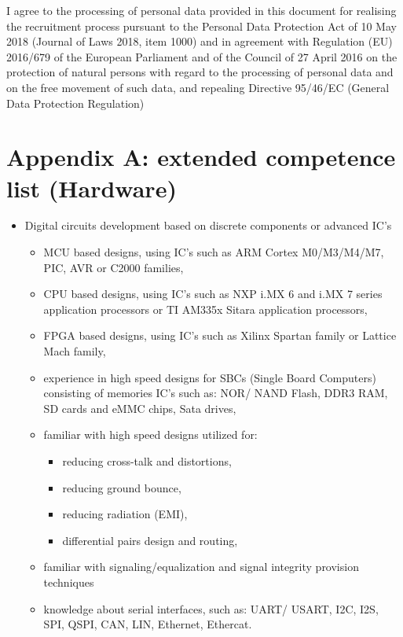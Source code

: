\documentclass{tccv}
\begin{document}
{\tiny I agree to the processing of personal data provided in this document for realising the recruitment process pursuant to the Personal Data Protection Act of 10 May 2018 (Journal of Laws 2018, item 1000) and in agreement with Regulation (EU) 2016/679 of the European Parliament and of the Council of 27 April 2016 on the protection of natural persons with regard to the processing of personal data and on the free movement of such data, and repealing Directive 95/46/EC (General Data Protection Regulation)}

\clearpage

\onecolumn

\section{Appendix A: extended competence list (Hardware)}

\begin{itemize}
	\item Digital circuits development based on discrete components or advanced IC's
		\begin{itemize}
			\item MCU based designs, using IC's such as ARM Cortex M0/M3/M4/M7, PIC, AVR or C2000 families,
			\item CPU based designs, using IC's such as NXP i.MX 6 and i.MX 7 series application processors or TI AM335x Sitara application processors,
			\item FPGA based designs, using IC's such as Xilinx Spartan family or Lattice Mach family,
			\item experience in high speed designs for SBCs (Single Board Computers) consisting of memories IC's such as: NOR/ NAND Flash, DDR3 RAM, SD cards and eMMC chips, Sata drives,
			\item familiar with high speed designs utilized for: 
				\begin{itemize}
				\item reducing cross-talk and distortions, 
				\item reducing ground bounce, 
				\item reducing radiation (EMI), 
				\item differential pairs design and routing,
				\end{itemize}
			\item familiar with signaling/equalization and signal integrity provision techniques
			\item knowledge about serial interfaces, such as: UART/ USART, I2C, I2S, SPI, QSPI, CAN, LIN, Ethernet, Ethercat.
		\end{itemize}
\end{itemize}
\end{document}
